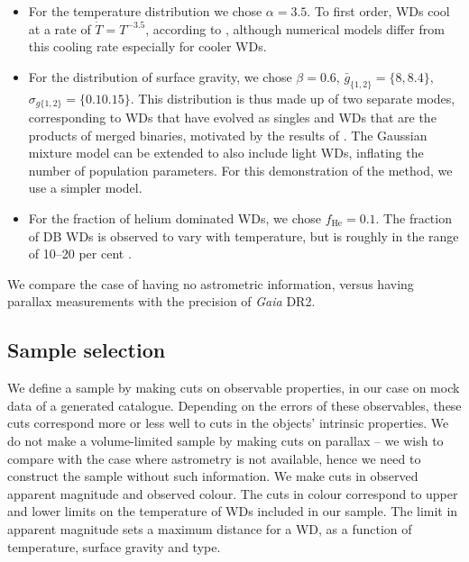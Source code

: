 \documentclass[fleqn,usenatbib]{mnras}
\newcommand{\Teff}{T}
\begin{document}
\begin{itemize}
	\item For the temperature distribution we chose $\alpha=3.5$. To first order, WDs cool at a rate of $\dot{\Teff} = \Teff^{-3.5}$, according to \cite{1952MNRAS.112..583M}, although numerical models differ from this cooling rate especially for cooler WDs.
	\item For the distribution of surface gravity, we chose $\beta=0.6$, $\bar{g}_{\{1,2\}}=\{8,8.4\}$, $\sigma_{g\{1,2\}}=\{0.10.15\}$. This distribution is thus made up of two separate modes, corresponding to WDs that have evolved as singles and WDs that are the products of merged binaries, motivated by the results of \citep{2018MNRAS.479L.113K}. The Gaussian mixture model can be extended to also include light WDs, inflating the number of population parameters. For this demonstration of the method, we use a simpler model.
	\item For the fraction of helium dominated WDs, we chose $f_\text{He}=0.1$. The fraction of DB WDs is observed to vary with temperature, but is roughly in the range of 10--20 per cent \citep{2011ApJ...737...28B}.
\end{itemize}

We compare the case of having no astrometric information, versus having parallax measurements with the precision of \emph{Gaia} DR2.




\subsection{Sample selection}\label{sec:sample_cuts}

We define a sample by making cuts on observable properties, in our case on mock data of a generated catalogue. Depending on the errors of these observables, these cuts correspond more or less well to cuts in the objects' intrinsic properties. We do not make a volume-limited sample by making cuts on parallax -- we wish to compare with the case where astrometry is not available, hence we need to construct the sample without such information. We make cuts in observed apparent magnitude and observed colour. The cuts in colour correspond to upper and lower limits on the temperature of WDs included in our sample. The limit in apparent magnitude sets a maximum distance for a WD, as a function of temperature, surface gravity and type.
\end{document}

